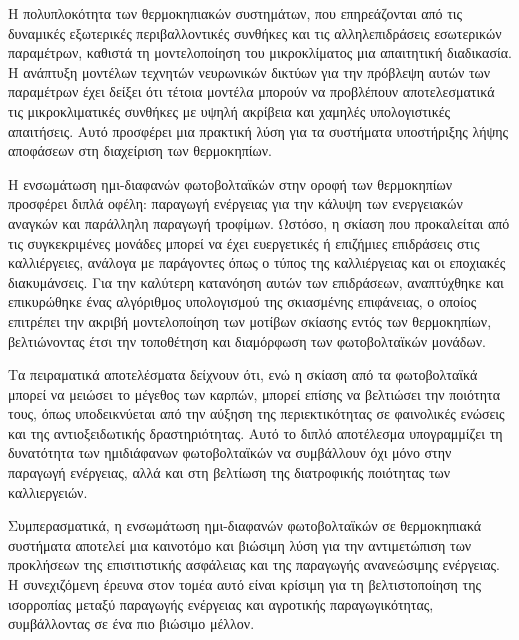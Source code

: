 \documentclass[12pt, a4paper]{report} %
\begin{document}
Η πολυπλοκότητα των θερμοκηπιακών συστημάτων, που επηρεάζονται από τις δυναμικές εξωτερικές περιβαλλοντικές συνθήκες και τις 
αλληλεπιδράσεις εσωτερικών παραμέτρων, καθιστά τη μοντελοποίηση του μικροκλίματος μια απαιτητική διαδικασία. Η ανάπτυξη 
μοντέλων τεχνητών νευρωνικών δικτύων για την πρόβλεψη αυτών των παραμέτρων έχει δείξει ότι τέτοια μοντέλα μπορούν να 
προβλέπουν αποτελεσματικά τις μικροκλιματικές συνθήκες με υψηλή ακρίβεια και χαμηλές υπολογιστικές απαιτήσεις. Αυτό προσφέρει 
μια πρακτική λύση για τα συστήματα υποστήριξης λήψης αποφάσεων στη διαχείριση των θερμοκηπίων.

Η ενσωμάτωση ημι-διαφανών φωτοβολταϊκών στην οροφή των θερμοκηπίων προσφέρει διπλά οφέλη: παραγωγή ενέργειας για την κάλυψη 
των ενεργειακών αναγκών και παράλληλη παραγωγή τροφίμων. Ωστόσο, η σκίαση που προκαλείται από τις συγκεκριμένες μονάδες μπορεί 
να έχει ευεργετικές ή επιζήμιες επιδράσεις στις καλλιέργειες, ανάλογα με παράγοντες όπως ο τύπος της καλλιέργειας και οι 
εποχιακές διακυμάνσεις. Για την καλύτερη κατανόηση αυτών των επιδράσεων, αναπτύχθηκε και επικυρώθηκε ένας αλγόριθμος 
υπολογισμού της σκιασμένης επιφάνειας, ο οποίος επιτρέπει την ακριβή μοντελοποίηση των μοτίβων σκίασης εντός των θερμοκηπίων, 
βελτιώνοντας έτσι την τοποθέτηση και διαμόρφωση των φωτοβολταϊκών μονάδων.

Τα πειραματικά αποτελέσματα δείχνουν ότι, ενώ η σκίαση από τα φωτοβολταϊκά μπορεί να μειώσει το μέγεθος των καρπών, μπορεί 
επίσης να βελτιώσει την ποιότητα τους, όπως υποδεικνύεται από την αύξηση της περιεκτικότητας σε φαινολικές ενώσεις και της 
αντιοξειδωτικής δραστηριότητας. Αυτό το διπλό αποτέλεσμα υπογραμμίζει τη δυνατότητα των ημιδιάφανων φωτοβολταϊκών να 
συμβάλλουν όχι μόνο στην παραγωγή ενέργειας, αλλά και στη βελτίωση της διατροφικής ποιότητας των καλλιεργειών.

Συμπερασματικά, η ενσωμάτωση ημι-διαφανών φωτοβολταϊκών σε θερμοκηπιακά συστήματα αποτελεί μια καινοτόμο και βιώσιμη λύση για 
την αντιμετώπιση των προκλήσεων της επισιτιστικής ασφάλειας και της παραγωγής ανανεώσιμης ενέργειας. Η συνεχιζόμενη έρευνα 
στον τομέα αυτό είναι κρίσιμη για τη βελτιστοποίηση της ισορροπίας μεταξύ παραγωγής ενέργειας και αγροτικής παραγωγικότητας, 
συμβάλλοντας σε ένα πιο βιώσιμο μέλλον.




\newpage

\appendix
\setcounter{subsection}{0} %
\setcounter{figure}{0} %
\end{document}
